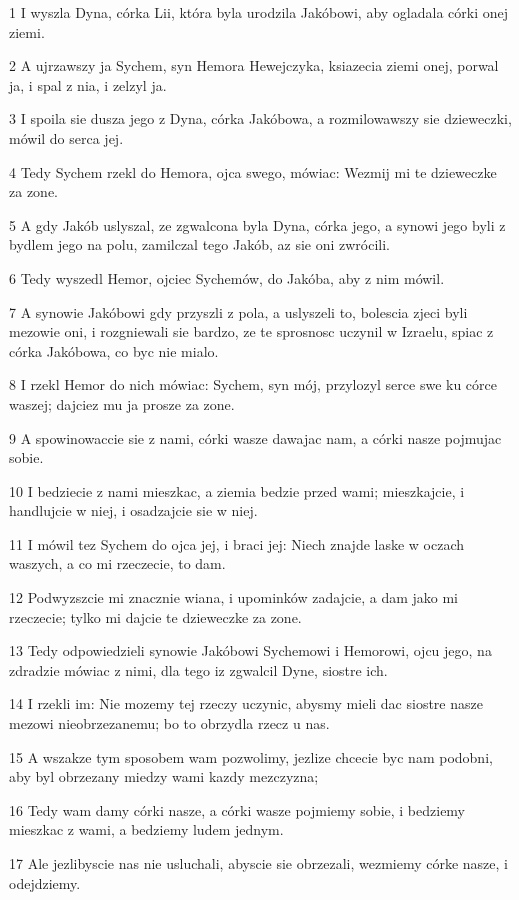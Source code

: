 \par 1 I wyszla Dyna, córka Lii, która byla urodzila Jakóbowi, aby ogladala córki onej ziemi.
\par 2 A ujrzawszy ja Sychem, syn Hemora Hewejczyka, ksiazecia ziemi onej, porwal ja, i spal z nia, i zelzyl ja.
\par 3 I spoila sie dusza jego z Dyna, córka Jakóbowa, a rozmilowawszy sie dzieweczki, mówil do serca jej.
\par 4 Tedy Sychem rzekl do Hemora, ojca swego, mówiac: Wezmij mi te dzieweczke za zone.
\par 5 A gdy Jakób uslyszal, ze zgwalcona byla Dyna, córka jego, a synowi jego byli z bydlem jego na polu, zamilczal tego Jakób, az sie oni zwrócili.
\par 6 Tedy wyszedl Hemor, ojciec Sychemów, do Jakóba, aby z nim mówil.
\par 7 A synowie Jakóbowi gdy przyszli z pola, a uslyszeli to, bolescia zjeci byli mezowie oni, i rozgniewali sie bardzo, ze te sprosnosc uczynil w Izraelu, spiac z córka Jakóbowa, co byc nie mialo.
\par 8 I rzekl Hemor do nich mówiac: Sychem, syn mój, przylozyl serce swe ku córce waszej; dajciez mu ja prosze za zone.
\par 9 A spowinowaccie sie z nami, córki wasze dawajac nam, a córki nasze pojmujac sobie.
\par 10 I bedziecie z nami mieszkac, a ziemia bedzie przed wami; mieszkajcie, i handlujcie w niej, i osadzajcie sie w niej.
\par 11 I mówil tez Sychem do ojca jej, i braci jej: Niech znajde laske w oczach waszych, a co mi rzeczecie, to dam.
\par 12 Podwyzszcie mi znacznie wiana, i upominków zadajcie, a dam jako mi rzeczecie; tylko mi dajcie te dzieweczke za zone.
\par 13 Tedy odpowiedzieli synowie Jakóbowi Sychemowi i Hemorowi, ojcu jego, na zdradzie mówiac z nimi, dla tego iz zgwalcil Dyne, siostre ich.
\par 14 I rzekli im: Nie mozemy tej rzeczy uczynic, abysmy mieli dac siostre nasze mezowi nieobrzezanemu; bo to obrzydla rzecz u nas.
\par 15 A wszakze tym sposobem wam pozwolimy, jezlize chcecie byc nam podobni, aby byl obrzezany miedzy wami kazdy mezczyzna;
\par 16 Tedy wam damy córki nasze, a córki wasze pojmiemy sobie, i bedziemy mieszkac z wami, a bedziemy ludem jednym.
\par 17 Ale jezlibyscie nas nie usluchali, abyscie sie obrzezali, wezmiemy córke nasze, i odejdziemy.
